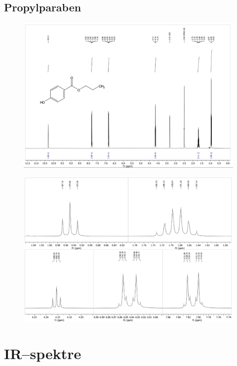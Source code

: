     \subsection{Propylparaben}
    \begin{figure}[H] \centering
        \includegraphics[width=\textwidth]{billeder/propylnmr}
        \caption{}
    \end{figure}

    \begin{figure}[H] \centering
        \includegraphics[width=\textwidth]{billeder/propylpeaks}
        \caption{}
    \end{figure} 

    \section{IR--spektre}

